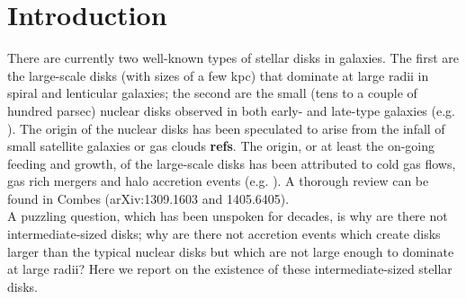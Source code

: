 \documentclass[12pt,preprint]{nature}
\begin{document}
\begin{abstract}
\end{abstract}



\section{Introduction}

There are currently two well-known types of stellar disks in galaxies. 
The first are the large-scale disks (with sizes of a few kpc)  
that dominate at large radii in spiral and lenticular galaxies; 
the second are the small (tens to a couple of hundred parsec) nuclear disks 
observed in both early- and late-type galaxies
(e.g. \citealt{scorzavandenbosch1998,rest2001,balcells2007,ledo2010}).
The origin of the nuclear disks has been speculated to arise 
from the infall of small satellite galaxies or gas clouds {\bf refs}.  
The origin, or at least the on-going feeding and growth, of the large-scale disks 
has been attributed to cold gas flows, gas rich mergers and halo accretion events 
(e.g. \citealt{khochfarsilk2006,dekel2009nat,dekel2009apj,ceverino2010,ceverino2012,conselice2012}).  
A thorough review can be found in Combes (arXiv:1309.1603 and 1405.6405). \\

A puzzling question, which has been unspoken for decades, 
is why are there not intermediate-sized disks; 
why are there not accretion events which create disks larger than the typical nuclear disks 
but which are not large enough to dominate at large radii? 
Here we report on the existence of these intermediate-sized stellar disks. \\
\end{document}
